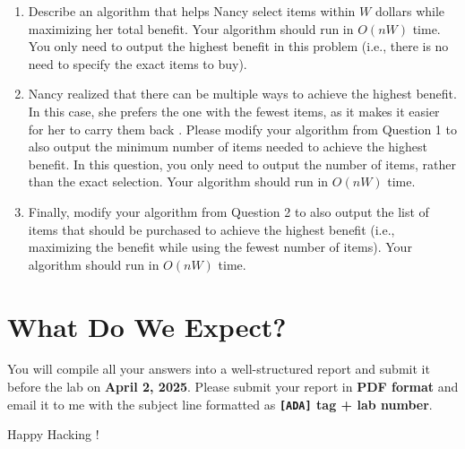 \documentclass[11pt]{article}
\begin{document}
\begin{tcolorbox}[title=Questions]
    \begin{enumerate}
        \item Describe an algorithm that helps Nancy select items within $W$ dollars while maximizing her total benefit. Your algorithm should run in $O(nW)$ time. You only need to output the highest benefit in this problem (i.e., there is no need to specify the exact items to buy).

        \item Nancy realized that there can be multiple ways to achieve the highest benefit. In this case, she prefers the one with the fewest items, as it makes it easier for her to carry them back . Please modify your algorithm from Question 1 to also output the minimum number of items needed to achieve the highest benefit. In this question, you only need to output the number of items, rather than the exact selection. Your algorithm should run in $O(nW)$ time.

        \item Finally, modify your algorithm from Question 2 to also output the list of items that should be purchased to achieve the highest benefit (i.e., maximizing the benefit while using the fewest number of items). Your algorithm should run in $O(nW)$ time.
    \end{enumerate}
\end{tcolorbox}

\section{What Do We Expect?}
You will compile all your answers into a well-structured report and submit it before the lab on \textbf{April 2, 2025}. Please submit your report in \textbf{PDF format} and email it to me with the subject line formatted as \textbf{\texttt{[ADA]} tag + lab number}.

\vspace{5mm}
Happy Hacking !
\end{document}
